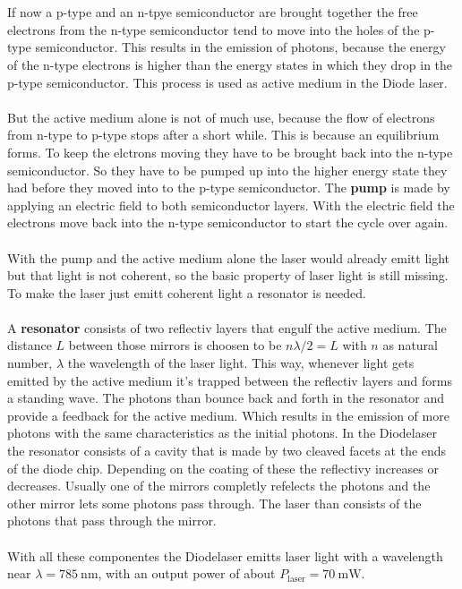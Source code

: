 \\\\
\FloatBarrier
If now a p-type and an n-tpye semiconductor are brought together the free electrons from the n-type semiconductor tend to move into the holes of the p-type semiconductor.
This results in the emission of photons, because the energy of the n-type electrons is higher than the energy states in which they drop in the p-type semiconductor.
This process is used as active medium in the Diode laser.
\\\\
But the active medium alone is not of much use, because the flow of electrons from n-type to p-type stops after a short while.
This is because an equilibrium forms.
To keep the elctrons moving they have to be brought back into the n-type semiconductor.
So they have to be pumped up into the higher energy state they had before they moved into to the p-type semiconductor.
The \textbf{pump} is made by applying an electric field to both semiconductor layers.
With the electric field the electrons move back into the n-type semiconductor to start the cycle over again.
\\\\
With the pump and the active medium alone the laser would already emitt light but that light is not coherent, so the basic property of laser light is still missing.
To make the laser just emitt coherent light a resonator is needed.
\\\\
A \textbf{resonator} consists of two reflectiv layers that engulf the active medium.
The distance $L$ between those mirrors is choosen to be $n \lambda/2 = L$ with $n$ as natural number, $\lambda$ the wavelength of the laser light.
This way, whenever light gets emitted by the active medium it's trapped between the reflectiv layers and forms a standing wave.
The photons than bounce back and forth in the resonator and provide a feedback for the active medium.
Which results in the emission of more photons with the same characteristics as the initial photons.
In the Diodelaser the resonator consists of a cavity that is made by two cleaved facets at the ends of the diode chip.
Depending on the coating of these the reflectivy increases or decreases.
Usually one of the mirrors completly refelects the photons and the other mirror lets some photons pass through.
The laser than consists of the photons that pass through the mirror.
\\\\
With all these componentes the Diodelaser emitts laser light with a wavelength near $\lambda = \SI{785}{\nano\meter}$, with an output power of about $P_\text{laser} = \SI{70}{\milli\W}$.

